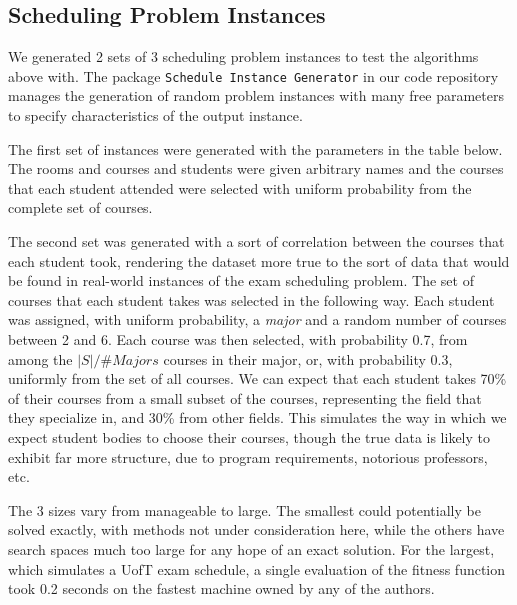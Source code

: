 \documentclass[letterpaper]{article}
\begin{document}
    \subsection{Scheduling Problem Instances}
      We generated 2 sets of 3 scheduling problem instances to test the algorithms above with. 
      The package \texttt{Schedule Instance Generator} in our code repository manages the generation of 
      random problem instances with many free parameters to specify characteristics of the 
      output instance.
      
      The first set of instances were generated with the parameters in the table below. 
      The rooms and courses and students were given arbitrary names and the courses that each 
      student attended were selected with uniform probability from the complete set of courses.
      
      The second set was generated with a sort of correlation between the courses that each student 
      took, rendering the dataset more true to the sort of data that would be found in real-world 
      instances of the exam scheduling problem. The set of courses that each student takes was 
      selected in the following way. Each student was assigned, with uniform probability, a \emph{major} 
      and a random number of courses between 2 and 6. Each course was then selected, with probability 
      0.7, from among the $|S|/\#Majors$ courses in their major, or, with probability 0.3, uniformly from 
      the set of all courses. We can expect that each student takes 70\% of their courses from a small 
      subset of the courses, representing the field that they specialize in, and 30\% from other fields. 
      This simulates the way in which we expect student bodies to choose their courses, though the true 
      data is likely to exhibit far more structure, due to program requirements, notorious professors, etc.
      
      The 3 sizes vary from manageable to large. The smallest could potentially be solved exactly, 
      with methods not under consideration here, while the others have search spaces much too large 
      for any hope of an exact solution. For the largest, which simulates a UofT exam schedule, a 
      single evaluation of the fitness function took 0.2 seconds on the fastest machine owned by any 
      of the authors.
      
\end{document}
